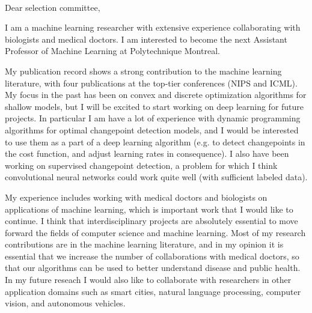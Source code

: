 \documentclass{article}
\begin{document}
\mbox{ }

Dear selection committee,

I am a 
machine learning researcher with extensive experience
collaborating with biologists and medical doctors. I am interested to
become the next Assistant Professor of Machine Learning at
Polytechnique Montreal. 


My publication record shows a strong contribution to the machine
learning literature, with four publications at the top-tier
conferences (NIPS and ICML). My focus in the past has been on convex
and discrete optimization algorithms for shallow models, but I will be
excited to start working on deep learning for future projects. In
particular I am have a lot of experience with dynamic programming
algorithms for optimal changepoint detection models, and I would be
interested to use them as a part of a deep learning algorithm (e.g. to
detect changepoints in the cost function, and adjust learning rates in
consequence). I also have been working on supervised changepoint
detection, a problem for which I think convolutional neural networks
could work quite well (with sufficient labeled data).

My experience includes working with medical doctors and biologists on
applications of machine learning, which is important work that I would
like to continue. I think that interdisciplinary projects are
absolutely essential to move forward the fields of
computer science and machine learning. Most of my research
contributions are in the machine learning literature, and in my
opinion it is essential that we increase the number of collaborations
with medical doctors, so that our algorithms can be used to better
understand disease and public health. In my future reseach I would also
like to collaborate with researchers in other application domains such as
smart cities, natural language processing, computer vision, and
autonomous vehicles.
\end{document}
